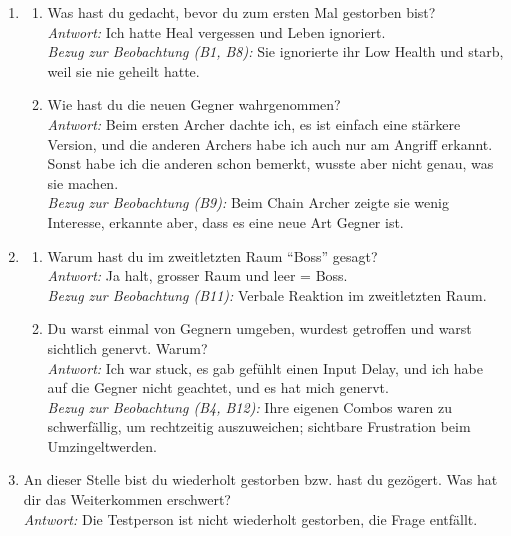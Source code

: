 \documentclass[../Main.tex]{subfiles}
\begin{document}
\begin{enumerate}[label=\textbf{I\arabic*}, leftmargin=1.5cm, itemsep=1em]
    \item
    \begin{enumerate}[label=\alph*), itemsep=0.6em]
        \item Was hast du gedacht, bevor du zum ersten Mal gestorben bist? \\
        \textit{Antwort:} Ich hatte Heal vergessen und Leben ignoriert. \\
        \textit{Bezug zur Beobachtung (B1, B8):} Sie ignorierte ihr Low Health und starb, weil sie nie geheilt hatte.
        \item Wie hast du die neuen Gegner wahrgenommen? \\
        \textit{Antwort:} Beim ersten Archer dachte ich, es ist einfach eine stärkere Version, und die anderen Archers habe ich auch nur am Angriff erkannt. Sonst habe ich die anderen schon bemerkt, wusste aber nicht genau, was sie machen. \\
        \textit{Bezug zur Beobachtung (B9):} Beim Chain Archer zeigte sie wenig Interesse, erkannte aber, dass es eine neue Art Gegner ist.
    \end{enumerate}

    \item
    \begin{enumerate}[label=\alph*), itemsep=0.6em]
        \item Warum hast du im zweitletzten Raum \enquote{Boss} gesagt? \\
        \textit{Antwort:} Ja halt, grosser Raum und leer = Boss. \\
        \textit{Bezug zur Beobachtung (B11):} Verbale Reaktion im zweitletzten Raum.
        \item Du warst einmal von Gegnern umgeben, wurdest getroffen und warst sichtlich genervt. Warum? \\
        \textit{Antwort:} Ich war stuck, es gab gefühlt einen Input Delay, und ich habe auf die Gegner nicht geachtet, und es hat mich genervt. \\
        \textit{Bezug zur Beobachtung (B4, B12):} Ihre eigenen Combos waren zu schwerfällig, um rechtzeitig auszuweichen; sichtbare Frustration beim Umzingeltwerden.
    \end{enumerate}

    \item An dieser Stelle bist du wiederholt gestorben bzw. hast du gezögert. Was hat dir das Weiterkommen erschwert? \\
    \textit{Antwort:} Die Testperson ist nicht wiederholt gestorben, die Frage entfällt.


\end{enumerate}
\end{document}
